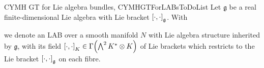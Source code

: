 \documentclass[preprint]{elsarticle}
\def\bas#1\eas{\begin{align*}#1\end{align*}}
\theoremstyle{plain}
\theoremstyle{remark}
\theoremstyle{definition}
\begin{document}
\begin{situations}{CYMH GT for Lie algebra bundles, \newline \cite[but here a simplified and coordinate-free version in the setting of Lie algebra bundles]{CurvedYMH}}{CYMHGTForLABsToDoList}
Let $\mathfrak{g}$ be a real finite-dimensional Lie algebra with Lie bracket $\mleft[ \cdot, \cdot \mright]_{\mathfrak{g}}$. With
\begin{center}
\end{center}
we denote an LAB over a smooth manifold $N$ with Lie algebra structure inherited by $\mathfrak{g}$, with its field $\mleft[ \cdot, \cdot \mright]_K \in \Gamma\mleft(\bigwedge^2 K^* \otimes K \mright)$ of Lie brackets which restricts to the Lie bracket $\mleft[ \cdot, \cdot \mright]_{\mathfrak{g}}$ on each fibre.
%


\end{situations}
\end{document}
